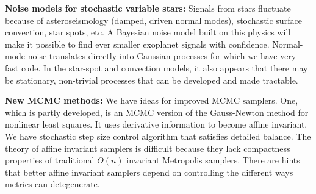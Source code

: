 \documentclass[12pt]{article}
\begin{document}
\textbf{Noise models for stochastic variable stars:}
Signals from stars fluctuate because of asteroseismology 
(damped, driven normal modes), stochastic surface convection, star
spots, etc.
A Bayesian noise model built on this physics will make it possible to 
find ever smaller exoplanet signals with confidence.
Normal-mode noise translates directly into Gaussian processes 
for which we have very fast code.
In the star-spot and convection models, it also appears that there may
be stationary, non-trivial processes that can be developed and made
tractable.



\textbf{New MCMC methods:}
We have ideas for improved MCMC samplers.
One, which is partly developed, is an MCMC version of the Gauss-Newton
method for nonlinear least squares.
It uses derivative information to become affine invariant.
We have stochastic step size control algorithm that satisfies
detailed balance.
The theory of affine invariant samplers is difficult because they
lack compactness properties of traditional $O(n)$ invariant Metropolis
samplers.
There are hints that better affine invariant samplers depend on 
controlling the different ways metrics can detegenerate.


\end{document}
